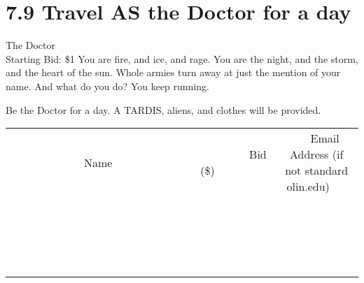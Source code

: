\documentclass[11pt]{article}
\begin{document}
\section*{7.9 Travel AS the Doctor for a day}
The Doctor
\\
Starting Bid: \$1
\newline
You are fire, and ice, and rage. You are the night, and the storm, and the heart of the sun. Whole armies turn away at just the mention of your name. And what do you do? You keep running.

Be the Doctor for a day. A TARDIS, aliens, and clothes will be provided.
\\[3ex]
\begin{tabular}{c c c}
~~~~~~~~~~~~~Name~~~~~~~~~~~~~ & ~~~~~~~~~Bid (\$)~~~~~~~~~  & ~~~Email Address (if not standard olin.edu)~~~\\
 & & \\
\hline
 & & \\
\hline
 & & \\
\hline
 & & \\
\hline
 & & \\
\hline
 & & \\
\hline
 & & \\
\hline
 & & \\
\hline
 & & \\
\hline
 & & \\
\hline
 & & \\
\hline
 & & \\
\hline
 & & \\
\hline
 & & \\
\hline
 & & \\
\hline
 & & \\
\hline
 & & \\
\hline
 & & \\
\hline
 & & \\
\hline
\end{tabular}
\newpage
\end{document}
